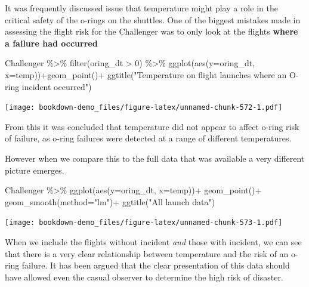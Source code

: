 \documentclass[
]{book}
\newenvironment{Shaded}{\begin{snugshade}}{\end{snugshade}}
\newcommand{\AttributeTok}[1]{\textcolor[rgb]{0.77,0.63,0.00}{#1}}
\newcommand{\DecValTok}[1]{\textcolor[rgb]{0.00,0.00,0.81}{#1}}
\newcommand{\FunctionTok}[1]{\textcolor[rgb]{0.00,0.00,0.00}{#1}}
\newcommand{\NormalTok}[1]{#1}
\newcommand{\SpecialCharTok}[1]{\textcolor[rgb]{0.00,0.00,0.00}{#1}}
\newcommand{\StringTok}[1]{\textcolor[rgb]{0.31,0.60,0.02}{#1}}
\begin{document}
It was frequently discussed issue that temperature might play a role in the critical safety of the o-rings on the shuttles.
One of the biggest mistakes made in assessing the flight risk for the Challenger was to only look at the flights \textbf{where a failure had occurred}

\begin{Shaded}
\begin{Highlighting}[]
\NormalTok{Challenger }\SpecialCharTok{\%\textgreater{}\%} 
  \FunctionTok{filter}\NormalTok{(oring\_dt }\SpecialCharTok{\textgreater{}} \DecValTok{0}\NormalTok{) }\SpecialCharTok{\%\textgreater{}\%} 
\FunctionTok{ggplot}\NormalTok{(}\FunctionTok{aes}\NormalTok{(}\AttributeTok{y=}\NormalTok{oring\_dt, }\AttributeTok{x=}\NormalTok{temp))}\SpecialCharTok{+}\FunctionTok{geom\_point}\NormalTok{()}\SpecialCharTok{+}
  \FunctionTok{ggtitle}\NormalTok{(}\StringTok{"Temperature on flight launches where an O{-}ring incident occurred"}\NormalTok{)}
\end{Highlighting}
\end{Shaded}

\texttt{[image: bookdown-demo\_files/figure-latex/unnamed-chunk-572-1.pdf]}

From this it was concluded that temperature did not appear to affect o-ring risk of failure, as o-ring failures were detected at a range of different temperatures.

However when we compare this to the full data that was available a very different picture emerges.

\begin{Shaded}
\begin{Highlighting}[]
\NormalTok{Challenger }\SpecialCharTok{\%\textgreater{}\%} 
\FunctionTok{ggplot}\NormalTok{(}\FunctionTok{aes}\NormalTok{(}\AttributeTok{y=}\NormalTok{oring\_dt, }
           \AttributeTok{x=}\NormalTok{temp))}\SpecialCharTok{+}
  \FunctionTok{geom\_point}\NormalTok{()}\SpecialCharTok{+}
  \FunctionTok{geom\_smooth}\NormalTok{(}\AttributeTok{method=}\StringTok{"lm"}\NormalTok{)}\SpecialCharTok{+}
  \FunctionTok{ggtitle}\NormalTok{(}\StringTok{"All launch data"}\NormalTok{)}
\end{Highlighting}
\end{Shaded}

\texttt{[image: bookdown-demo\_files/figure-latex/unnamed-chunk-573-1.pdf]}

When we include the flights without incident \emph{and} those with incident, we can see that there is a very clear relationship between temperature and the risk of an o-ring failure. It has been argued that the clear presentation of this data should have allowed even the casual observer to determine the high risk of disaster.
\end{document}
